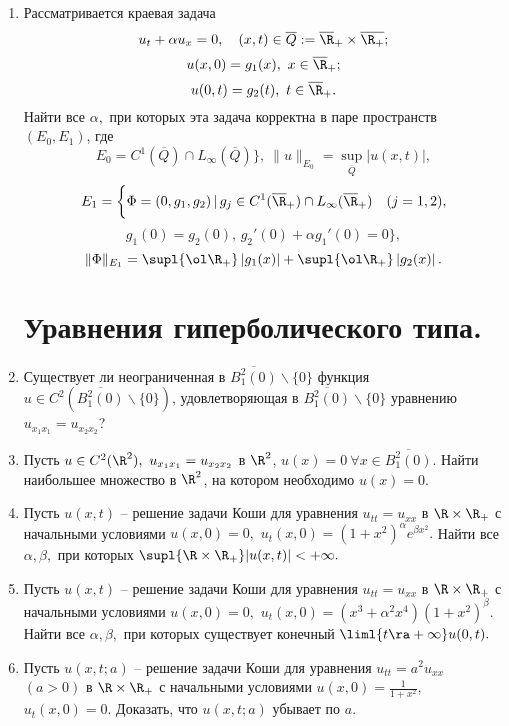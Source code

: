 \documentclass[a4paper]{article}
\def\a{\alpha}
\def\b{\beta}
\begin{document}
\begin{enumerate}
\item
Рассматривается краевая задача
$$u_{t}+\a u_x=0,\quad (x,t)\in \overline Q:=\overline{\R}_+\times
\overline{\R_+};
$$
$$u(x,0)=g_1(x), \ x\in \overline{\R}_+;$$
$$u(0,t)=g_2(t), \ t\in \overline{\R}_+.$$
Найти все $\a,$ при которых эта задача корректна в паре пространств
$(E_0,E_1)$, где
$$E_0=C^1(\overline Q)\cap L_\infty(\overline{Q})\}, \ \|u\|_{E_0}=\sup
\limits_{\overline Q}|u(x,t)|,$$
$$E_1=\bigg\{\Phi=(0,g_1,g_2)\, |\, g_j\in C^1(\overline{\R}_+)\cap L_\infty
(\overline{\R}_+) \quad(j=1,2),$$
$$g_1(0)=g_2(0),\, g_2'(0)+\a g_1'(0)=0\bigg\},$$
$$\|\Phi\|_{E_1}=\supl{\ol \R_+}\left|g_1(x)\right| +
\supl{\ol \R_+}\left|g_2(x)\right|.$$



\section{Уравнения гиперболического типа.}


\item
Существует ли неограниченная в $\overline{B_1^2(0)}\backslash\{0\}$
функция $u\in C^2(\overline{B_1^2(0)}\backslash\{0\})$, удовлетворяющая в
$\overline{B_1^2(0)}\backslash\{0\}$ уравнению $u_{x_1x_1}=u_{x_2x_2}$?

\item
Пусть $u\in C^2(\R^2), \ u_{x_1x_1}=u_{x_2x_2}$ в $\R^2$,
$u(x)=0\ \forall x \in \overline{B_1^2(0)}$. Найти наибольшее множество
в $\R^2$, на котором необходимо $u(x)=0.$

\item
Пусть $u(x,t)$ -- решение задачи Коши для уравнения $u_{tt}=u_{xx}$ в
$\R\times\R_+$ с начальными условиями $u(x,0)=0,$ $u_t(x,0)=(1+x^2)^\a
e^{\b x^2}.$ Найти все $\a,\b,$ при которых $\supl{\R \times \R_+}
|u(x,t)|<+\infty.$

\item
Пусть $u(x,t)$ -- решение задачи Коши для уравнения $u_{tt}=u_{xx}$ в
$\R\times\R_+$ с начальными условиями $u(x,0)=0,$ $u_t(x,0)=(x^3+\a^2x^4)
(1+x^2)^\b.$ Найти все $\a,\b,$ при которых существует конечный
$\liml{t\ra+\infty} u(0,t).$

\item
Пусть $u(x,t;a)$ -- решение задачи Коши для уравнения $u_{tt}=a^2u_{xx}$
$(a>0)$ в $\R\times\R_+$ с начальными условиями $u(x,0)=\displaystyle
{\frac{1}{1+x^2}},$ $u_t(x,0)=0.$ Доказать, что $u(x,t;a)$
убывает по $a.$


\end{enumerate}
\end{document}
